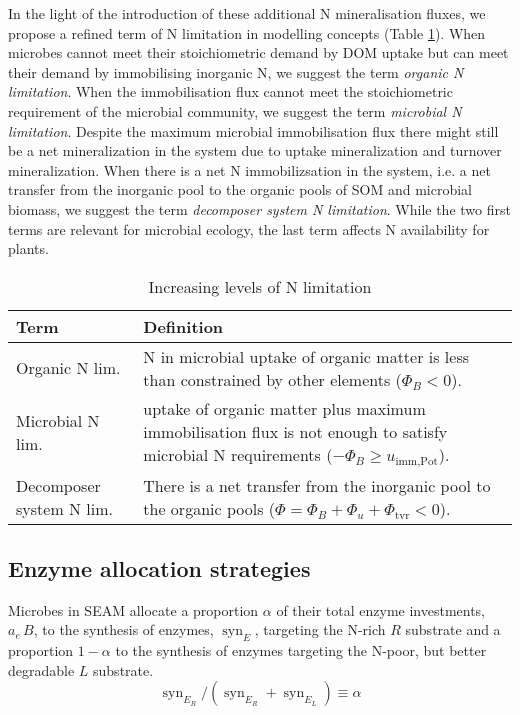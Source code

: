 In the light of the introduction of these additional N mineralisation fluxes,
we propose a refined term of N limitation in modelling concepts (Table
\ref{tab:NutrientLimDefs}).
When microbes cannot meet their stoichiometric demand by DOM uptake but can
meet their demand by immobilising inorganic N, we suggest the term 
\textit{organic N limitation}.
When the immobilisation flux cannot meet the stoichiometric requirement of the
microbial community, we suggest the term \textit{microbial N limitation}.
Despite the maximum microbial immobilisation flux there might still be a net
mineralization in the system due to uptake mineralization and turnover
mineralization. When there is a net N
immobilizsation in the system, i.e. a net transfer from the inorganic pool to
the organic pools of SOM and microbial biomass, we suggest the term 
\textit{decomposer system N limitation}. While the two first terms are relevant
for microbial ecology, the last term affects N availability for plants.

\begin{table}[t]
\caption{Increasing levels of N limitation \label{tab:NutrientLimDefs}}
\centering
\begin{tabular}{p{2.3cm}p{5.5cm}}
\hline
Term &  Definition \\
\hline
Organic N lim. & N in microbial uptake of organic matter is less than 
constrained by other elements (${\Phi_B < 0}$).
\\
Microbial N lim. & uptake of organic matter plus maximum immobilisation flux is
not enough to satisfy microbial N requirements (${-\Phi_B \ge
u_{\operatorname{imm,Pot}}}$).
\\
Decomposer system N lim. & There is a net transfer from the inorganic pool to
the organic pools (${\Phi = \Phi_B+\Phi_u+\Phi_{\operatorname{tvr}}<0}$).
\\
\hline
\end{tabular}
\end{table}
 
\subsection{ Enzyme allocation strategies} 
\label{sec:AllocStrategies}

Microbes in SEAM allocate a proportion $\alpha$ of their total enzyme
investments, $a_e\,B$, to the synthesis of enzymes, $\operatorname{syn}_{E}$, targeting the
N-rich $R$ substrate and a proportion $1 - \alpha$ to the synthesis of enzymes
targeting the N-poor, but better degradable $L$ substrate.
\begin{equation} 
\label{eq:alpha}
\operatorname{syn}_{E_R} /
(\operatorname{syn}_{E_R} + \operatorname{syn}_{E_L}) \equiv \alpha
\end{equation}

